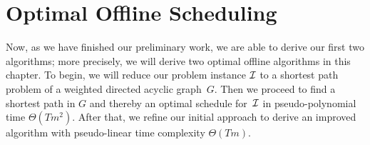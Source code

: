 
\chapter{Optimal Offline Scheduling}\label{chap:opt_offline_schedule}
Now, as we have finished our preliminary work, we are able to derive our first two algorithms; more precisely, we will derive two optimal offline algorithms in this chapter.
To begin, we will reduce our problem instance $\mathcal{I}$ to a shortest path problem of a weighted directed acyclic graph~$G$. Then we proceed to find a shortest path in $G$ and thereby an optimal schedule for~$\mathcal{I}$ in pseudo-polynomial time $\Theta(Tm^2)$.
After that, we refine our initial approach to derive an improved algorithm with pseudo-linear time complexity $\Theta(Tm)$.

